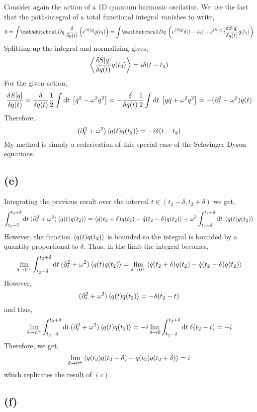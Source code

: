 \documentclass[12pt]{article}
\begin{document}
Consider again the action of a 1D quantum harmonic oscilatior. We use the fact that the path-integral of a total functional integral vanishes to write,
\begin{align*}
0 = \int \pathd{q} \fderiv{}{q(t)} \left( e^{i S[q]} q(t_2) \right) = \int \pathd{q} \left( e^{i S[q]} \delta(t - t_2) + e^{i S[q]} \: i \fderiv{S[q]}{q(t)} q(t_2) \right)
\end{align*}
Splitting up the integral and normalizing gives,
\[ \left<  \frac{\delta S[q]}{\delta q(t)} q(t_2) \right> = i \delta(t - t_2) \]
For the given action,
\[ \frac{\delta S[q]}{\delta q(t)} = \frac{\delta }{\delta q(t)} \frac{1}{2} \int \mathrm{d}t \: \left[ \dot{q}^2 - \omega^2 q^2 \right] = - \frac{\delta }{\delta q(t)} \frac{1}{2} \int \mathrm{d}t \: \left[ q \ddot{q} + \omega^2 q^2 \right] = - (\partial_t^2 + \omega^2) q(t) \]
Therefore,
\[ (\partial_t^2 + \omega^2) \left<  q(t) q(t_2)  \right> = -i \delta(t - t_2) \]
My method is simply a rederivation of this special case of the Schwinger-Dyson  equations.

\subsection{(e)}

Integrating the previous result over the interval $t \in (t_2 - \delta, t_2 + \delta)$ we get,
\begin{align*}
\int_{t_2 - \delta}^{t_2 + \delta} \mathrm{d}t \: (\partial_t^2 + \omega^2) \left< q(t) q(t_2) \right> = \left< \dot{q}(t_2 + \delta) q(t_2) - \dot{q}(t_2 - \delta) q(t_2) \right> + \omega^2 \int_{t_2 - \delta}^{t_2 + \delta} \mathrm{d}t \: \left< q(t) q(t_2) \right> 
\end{align*}
However, the function $\left< q(t)q(t_2) \right>$ is bounded so the integral is bounded by a quantity proportional to $\delta$. Thus, in the limit the integral becomes,
\[ \lim_{\delta \to 0^+} \int_{t_2 - \delta}^{t_2 + \delta} \mathrm{d}t \: (\partial_t^2 + \omega^2) \left< q(t) q(t_2) \right> = \lim_{\delta \to 0^+} \left< \dot{q}(t_2 + \delta) q(t_2) - \dot{q}(t_2 - \delta) q(t_2) \right> \]
However, 
\[ (\partial_t^2 + \omega^2) \left< q(t) q(t_2) \right> = - \delta(t_2 - t) \]
and thus,
\[  \lim_{\delta \to 0^+} \int_{t_2 - \delta}^{t_2 + \delta} \mathrm{d}t \: (\partial_t^2 + \omega^2) \left< q(t) q(t_2) \right> = - i \lim_{\delta \to 0} \int_{t_2 - \delta}^{t_2 + \delta} \mathrm{d}t \: \delta(t_2 - t) = - i \]
Therefore, we get,
\[ \lim_{\delta \to 0^+} \left< q(t_2) \dot{q}(t_2 - \delta) - q(t_2) \dot{q}(t_2 + \delta)  \right> = i \]
which replicates the result of $(c)$.

\subsection{(f)}
\end{document}
